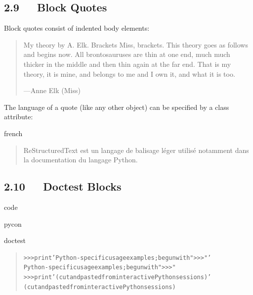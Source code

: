 \documentclass[a4paper]{article}
\begin{document}
\subsection{2.9   Block Quotes%
  \label{block-quotes}%
}

Block quotes consist of indented body elements:

\begin{quote}
My theory by A. Elk.  Brackets Miss, brackets.  This theory goes
as follows and begins now.  All brontosauruses are thin at one
end, much much thicker in the middle and then thin again at the
far end.  That is my theory, it is mine, and belongs to me and I
own it, and what it is too.
\nopagebreak

\raggedleft —Anne Elk (Miss)
\end{quote}

The language of a quote (like any other object) can be specified by
a class attribute:

% 

\begin{selectlanguage}{french}
\begin{quote}
ReStructuredText est un langage de balisage léger utilisé
notamment dans la documentation du langage Python.
\end{quote}
\end{selectlanguage}


\subsection{2.10   Doctest Blocks%
  \label{doctest-blocks}%
}

\begin{DUclass}{code}
\begin{DUclass}{pycon}
\begin{DUclass}{doctest}
\begin{quote}
\begin{alltt}
>>> print 'Python-specific usage examples; begun with ">>>"'
Python-specific usage examples; begun with ">>>"
>>> print '(cut and pasted from interactive Python sessions)'
(cut and pasted from interactive Python sessions)
\end{alltt}
\end{quote}
\end{DUclass}
\end{DUclass}
\end{DUclass}
\end{document}
